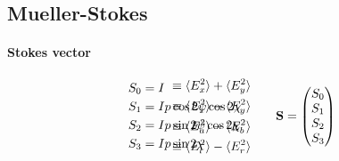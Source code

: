 \subsection{Mueller-Stokes}\label{sec:Mueller-Stokes}
% 
\paragraph{Stokes vector}
\begin{align}
\begin{split}
S_0 &= I \\
S_1 &= I p \cos 2\psi \cos 2\chi \\
S_2 &= I p \sin 2\psi \cos 2\chi \\
S_3 &= I p \sin 2\chi
\end{split} \hspace{-6em}
\begin{split}
& \equiv \langle E_x^{2} \rangle + \langle E_y^{2} \rangle \\
& \equiv \langle E_x^{2} \rangle - \langle E_y^{2} \rangle \\
& \equiv \langle E_a^{2} \rangle - \langle E_b^{2} \rangle \\
& \equiv  \langle E_l^{2} \rangle - \langle E_r^{2} \rangle
\end{split}
\hspace{2em}
\mathbf{S} =
\begin{pmatrix} S_0 \\ S_1 \\ S_2 \\ S_3\end{pmatrix}
\end{align}
% 
% 
